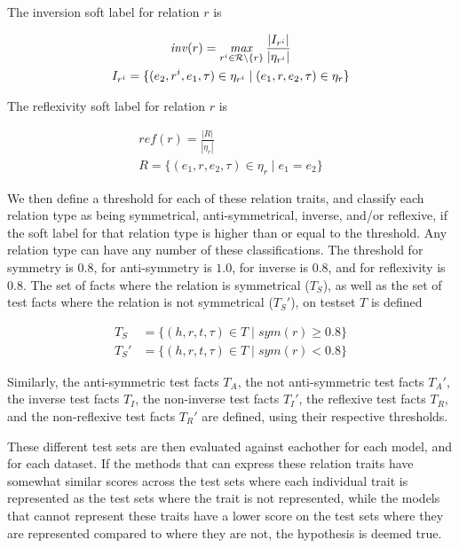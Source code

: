 \noindent
The inversion soft label for relation $r$ is

\begin{equation}
\begin{gathered}
\mathit{inv}(r) = \operatorname*{\mathit{max}}\limits_{r^i \in \mathcal{R} \setminus \{r\} } \frac{|I_{r^i}|}{|\eta_{r^i}|}\\
I_{r^i} = \{ (e_2, r^i, e_1, \tau) \in \eta_{r^i}  \mid (e_1, r, e_2, \tau) \in \eta_r \}
\end{gathered}
\end{equation}

\noindent
The reflexivity soft label for relation $r$ is

\begin{equation}
\begin{gathered}
\mathit{ref}(r) = \frac{|R|}{|\eta_r|}\\
R = \{ (e_1, r, e_2, \tau) \in \eta_r \mid e_1 = e_2 \}
\end{gathered}
\end{equation}

We then define a threshold for each of these relation traits, and classify each relation type as being symmetrical, anti-symmetrical, inverse, and/or reflexive, if the soft label for that relation type is higher than or equal to the threshold. Any relation type can have any number of these classifications. The threshold for symmetry is $0.8$, for anti-symmetry is $1.0$, for inverse is $0.8$, and for reflexivity is $0.8$. The set of facts where the relation is symmetrical ($T_S$), as well as the set of test facts where the relation is not symmetrical ($T_S'$), on testset $T$ is defined

\begin{equation}
\begin{aligned}
T_S & = \{ (h, r, t, \tau) \in T \mid \mathit{sym}(r) \geq 0.8 \}\\
T_S' & = \{ (h, r, t, \tau) \in T \mid \mathit{sym}(r) < 0.8 \}
\end{aligned}
\end{equation}

\noindent
Similarly, the anti-symmetric test facts $T_A$, the not anti-symmetric test facts $T_A'$, the inverse test facts $T_I$, the non-inverse test facts $T_I'$, the reflexive test facts $T_R$, and the non-reflexive test facts $T_R'$ are defined, using their respective thresholds.

These different test sets are then evaluated against eachother for each model, and for each dataset. If the methods that can express these relation traits have somewhat similar scores across the test sets where each individual trait is represented as the test sets where the trait is not represented, while the models that cannot represent these traits have a lower score on the test sets where they are represented compared to where they are not, the hypothesis is deemed true.

